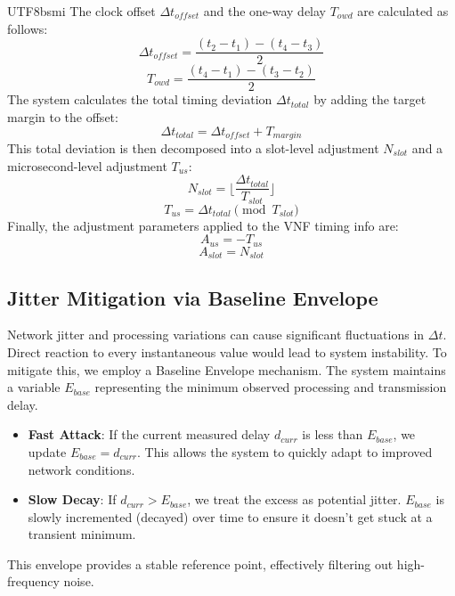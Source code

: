 \documentclass[conference]{IEEEtran}
\begin{document}
\begin{CJK}{UTF8}{bsmi}
{The clock offset $\Delta t_{offset}$ and the one-way delay $T_{owd}$ are calculated as follows:
} 
\begin{equation}
    \Delta t_{offset} = \frac{(t_2 - t_1) - (t_4 - t_3)}{2}
\end{equation}
\begin{equation}
    T_{owd} = \frac{(t_4 - t_1) - (t_3 - t_2)}{2}
\end{equation}
{\color{blue}
The system calculates the total timing deviation $\Delta t_{total}$ by adding the target margin to the offset:
}
\begin{equation}
    \Delta t_{total} = \Delta t_{offset} + T_{margin}
\end{equation}
{\color{blue}
This total deviation is then decomposed into a slot-level adjustment $N_{slot}$ and a microsecond-level adjustment $T_{us}$:
}
\begin{equation}
    N_{slot} = \lfloor \frac{\Delta t_{total}}{T_{slot}} \rfloor
\end{equation}
\begin{equation}
    T_{us} = \Delta t_{total} \pmod{T_{slot}}
\end{equation}
{\color{blue}
Finally, the adjustment parameters applied to the VNF timing info are:
}
\begin{equation}
    A_{us} = -T_{us}
\end{equation}
\begin{equation}
    A_{slot} = N_{slot}
\end{equation}

{\color{blue}
\subsection{Jitter Mitigation via Baseline Envelope}
Network jitter and processing variations can cause significant fluctuations in $\Delta t$. Direct reaction to every instantaneous value would lead to system instability. To mitigate this, we employ a Baseline Envelope mechanism.
The system maintains a variable $E_{base}$ representing the minimum observed processing and transmission delay.
\begin{itemize}
    \item \textbf{Fast Attack}: If the current measured delay $d_{curr}$ is less than $E_{base}$, we update $E_{base} = d_{curr}$. This allows the system to quickly adapt to improved network conditions.
    \item \textbf{Slow Decay}: If $d_{curr} > E_{base}$, we treat the excess as potential jitter. $E_{base}$ is slowly incremented (decayed) over time to ensure it doesn't get stuck at a transient minimum.
\end{itemize}
This envelope provides a stable reference point, effectively filtering out high-frequency noise.

}
\end{CJK}
\end{document}
